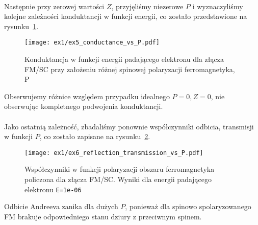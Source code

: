 \documentclass{article}
\begin{document}
\\
Następnie przy zerowej wartości $Z$, przyjęliśmy niezerowe $P$ i wyznaczyliśmy kolejne zależności konduktancji w funkcji energii, co zostało przedstawione na rysunku~\ref{fig:ex1-conductance-P}.
\begin{figure}[htp!]
    \centering
    \texttt{[image: ex1/ex5\_conductance\_vs\_P.pdf]}
    \caption{ Konduktancja w funkcji energii padającego elektronu dla złącza FM/SC przy założeniu różnej
spinowej polaryzacji ferromagnetyka, P}
    \label{fig:ex1-conductance-P}
\end{figure}
Obserwujemy różnice względem przypadku idealnego $P=0, Z=0$, nie obserwując kompletnego podwojenia konduktancji.\\
\\
Jako ostatnią zależność, zbadaliśmy ponownie współczynniki odbicia, transmisji w funkcji $P$, co zostało zapisane na rysunku~\ref{fig:ex1-conductance-e-06}.
\begin{figure}[htp!]
    \centering
    \texttt{[image: ex1/ex6\_reflection\_transmission\_vs\_P.pdf]}
    \caption{Współczynniki w funkcji polaryzacji obszaru ferromagnetyka policzona dla złącza FM/SC. Wyniki dla energii padającego elektronu \texttt{E=1e-06}}
    \label{fig:ex1-conductance-e-06}
\end{figure}
Odbicie Andreeva zanika dla dużych $P$, ponieważ dla spinowo spolaryzowanego FM brakuje odpowiedniego stanu dziury z przeciwnym spinem.
\newpage
\end{document}
